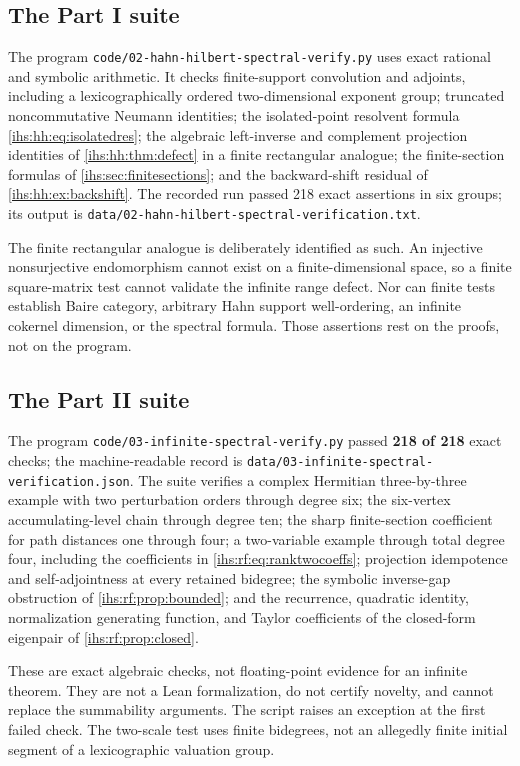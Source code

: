 \documentclass[11pt,a4paper]{article}
\numberwithin{equation}{section}
\theoremstyle{definition}
\theoremstyle{remark}
\begin{document}
\subsection{The Part I suite}\label{ihs:sec:checksone}
The program \texttt{code/02-hahn-hilbert-spectral-verify.py} uses exact
rational and symbolic arithmetic. It checks finite-support convolution and
adjoints, including a lexicographically ordered two-dimensional exponent
group; truncated noncommutative Neumann identities; the isolated-point
resolvent formula \eqref{ihs:hh:eq:isolatedres}; the algebraic left-inverse
and complement projection identities of \cref{ihs:hh:thm:defect} in a finite
rectangular analogue; the finite-section formulas of
\cref{ihs:sec:finitesections}; and the backward-shift residual of
\cref{ihs:hh:ex:backshift}. The recorded run passed 218 exact assertions in
six groups; its output is
\texttt{data/02-hahn-hilbert-spectral-verification.txt}.

The finite rectangular analogue is deliberately identified as such. An
injective nonsurjective endomorphism cannot exist on a finite-dimensional
space, so a finite square-matrix test cannot validate the infinite range
defect. Nor can finite tests establish Baire category, arbitrary Hahn
support well-ordering, an infinite cokernel dimension, or the spectral
formula. Those assertions rest on the proofs, not on the program.

\subsection{The Part II suite}\label{ihs:sec:checkstwo}
The program \texttt{code/03-infinite-spectral-verify.py} passed
\textbf{218 of 218} exact checks; the machine-readable record is
\texttt{data/03-infinite-spectral-verification.json}. The suite verifies a
complex Hermitian three-by-three example with two perturbation orders
through degree six; the six-vertex accumulating-level chain through degree
ten; the sharp finite-section coefficient for path distances one through
four; a two-variable example through total degree four, including the
coefficients in \eqref{ihs:rf:eq:ranktwocoeffs}; projection idempotence and
self-adjointness at every retained bidegree; the symbolic inverse-gap
obstruction of \cref{ihs:rf:prop:bounded}; and the recurrence, quadratic
identity, normalization generating function, and Taylor coefficients of the
closed-form eigenpair of \cref{ihs:rf:prop:closed}.

These are exact algebraic checks, not floating-point evidence for an
infinite theorem. They are not a Lean formalization, do not certify novelty,
and cannot replace the summability arguments. The script raises an exception
at the first failed check. The two-scale test uses finite bidegrees, not an
allegedly finite initial segment of a lexicographic valuation group.
\end{document}
